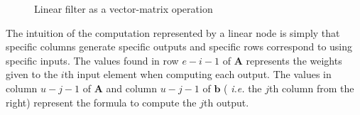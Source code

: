 \begin{figure}[t]
\vspace{-6pt}
\center
\epsfxsize=3.0in
\vspace{-12pt}
\caption{Linear filter as a vector-matrix operation}
\label{fig:overview-matrix}
\vspace{-12pt}
\end{figure}




The intuition of the computation represented by a linear node is
simply that specific columns generate specific outputs and specific
rows correspond to using specific inputs.  The values found in row
$e-i-1$ of ${\mathbf A}$ represents the weights given to the $i$th
input element when computing each output.  The values in column
$u-j-1$ of ${\mathbf A}$ and column $u-j-1$ of ${\mathbf b}$ ({\it
i.e.} the $j$th column from the right) represent the formula to
compute the $j$th output.